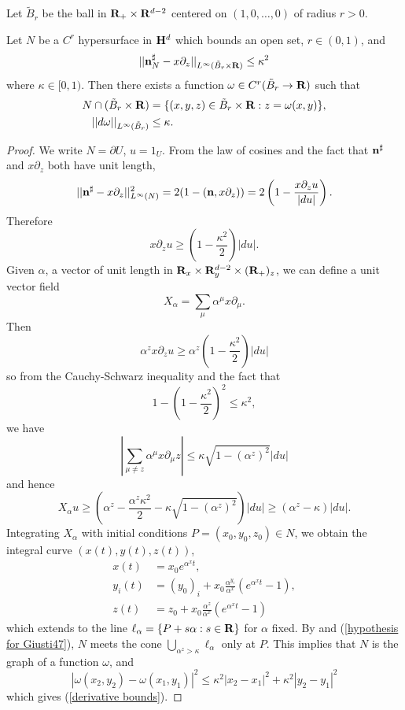 \begin{notation}
Let $\tilde B_r$ be the ball in $\mathbf{R}_+ \times \mathbf{R}^{d - 2}$ centered on $(1, 0, \dots, 0)$ of radius $r > 0$.
\end{notation}

\begin{lemma}\label{hopfKilling}
Let $N$ be a $C^r$ hypersurface in $\mathbf H^d$ which bounds an open set, $r \in (0, 1)$, and
$$||\mathbf n_N^\sharp - x\partial_z||_{L^\infty(\tilde B_r \times \mathbf{R})} \leq \kappa^2$$
where $\kappa \in [0, 1)$.
Then there exists a function $\omega \in C^r(\tilde B_r \to \mathbf{R})$
such that
\begin{align}
    N \cap (\tilde B_r \times \mathbf{R}) &= \{(x, y, z) \in \tilde B_r\times \mathbf{R}: z = \omega(x, y)\}, \label{N is a graph}\\
    ||d\omega||_{L^\infty(\tilde B_r)} &\leq \kappa. \label{derivative bounds}
\end{align}
\end{lemma}
\begin{proof}
We write $N = \partial U$, $u = 1_U$.
From the law of cosines and the fact that $\mathbf n^\sharp$ and $x\partial_z$ both have unit length,
$$||\mathbf n^\sharp - x\partial_z||_{L^\infty(N)}^2 = 2(1 - (\mathbf n, x\partial_z)) = 2\left(1 - \frac{x\partial_z u}{|du|}\right).$$
Therefore
$$x\partial_z u \geq \left(1 - \frac{\kappa^2}{2}\right) |du|.$$
Given $\alpha$, a vector of unit length in $\mathbf{R}_x \times \mathbf{R}^{d - 2}_y \times (\mathbf{R}_+)_z$, we can define a unit vector field
$$X_\alpha = \sum_\mu \alpha^\mu x\partial_\mu.$$
Then
$$\alpha^z x\partial_z u \geq \alpha^z \left(1 - \frac{\kappa^2}{2}\right) |du|$$
so from the Cauchy-Schwarz inequality and the fact that
$$1 - \left(1 - \frac{\kappa^2}{2}\right)^2 \leq \kappa^2,$$
we have
$$\left|\sum_{\mu \neq z} \alpha^\mu x\partial_\mu z\right| \leq \kappa\sqrt{1 - (\alpha^z)^2} |du|$$
and hence
\begin{equation}\label{hypothesis for Giusti47}
X_\alpha u \geq \left(\alpha^z - \frac{\alpha^z \kappa^2}{2} - \kappa\sqrt{1 - (\alpha^z)^2}\right)|du| \geq (\alpha^z - \kappa)|du|.
\end{equation}
Integrating $X_\alpha$ with initial conditions $P = (x_0, y_0, z_0) \in N$, we obtain the integral curve $(x(t), y(t), z(t))$,
\begin{align*}
x(t) &= x_0 e^{\alpha^x t}, \\
y_i(t) &= (y_0)_i + x_0 \frac{\alpha^{y_i}}{\alpha^x}(e^{\alpha^x t} - 1),\\
z(t) &= z_0 + x_0 \frac{\alpha^z}{\alpha^x}(e^{\alpha^x t} - 1)
\end{align*}
which extends to the line $\ell_\alpha = \{P + s\alpha: s \in \mathbf{R}\}$ for $\alpha$ fixed. 
By \cite[Remark 4.7]{Giusti77} and (\ref{hypothesis for Giusti47}), $N$ meets the cone $\bigcup_{\alpha^z > \kappa} \ell_\alpha$
only at $P$. This implies that $N$ is the graph of a function $\omega$, and 
$$|\omega(x_2, y_2) - \omega(x_1, y_1)|^2 \leq \kappa^2 |x_2 - x_1|^2 + \kappa^2 |y_2 - y_1|^2$$
which gives (\ref{derivative bounds}).
\end{proof}

